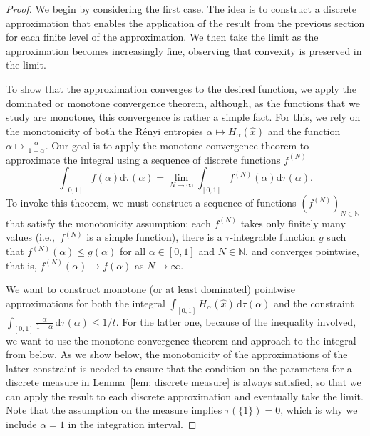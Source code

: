 \documentclass[aps,pra,11pt,onecolumn,nofootinbib,tightenlines]{revtex4-2}
\theoremstyle{definition}
\def \d {\mathrm{d}}
\newcommand{\mb}[1]{\mathbb{#1}}
\begin{document}
\begin{proof}
We begin by considering the first case. The idea is to construct a discrete approximation that enables the application of the result from the previous section for each finite level of the approximation. We then take the limit as the approximation becomes increasingly fine, observing that convexity is preserved in the limit. 

To show that the approximation converges to the desired function, we apply the dominated or monotone convergence theorem, although, as the functions that we study are monotone, this convergence is rather a simple fact. For this, we rely on the monotonicity of both the Rényi entropies $\alpha \mapsto H_\alpha(\hat{x})$ and the function $\alpha \mapsto \frac{\alpha}{1 - \alpha}$. Our goal is to apply the monotone convergence theorem to approximate the integral using a sequence of discrete functions $f^{(N)}$
\begin{equation}
\int_{[0,1]} f(\alpha)\d\tau(\alpha) = \lim_{N \to \infty} \int_{[0,1]} f^{(N)}(\alpha) \d\tau(\alpha).
\end{equation}
To invoke this theorem, we must construct a sequence of functions $(f^{(N)})_{N \in \mathbb{N}}$ that satisfy the monotonicity assumption: each $f^{(N)}$ takes only finitely many values (i.e.,\ $f^{(N)}$ is a simple function), there is a $\tau$-integrable function $g$ such that $f^{(N)}(\alpha) \leq g(\alpha)$ for all $\alpha \in [0,1]$ and $N\in\mb N$, and converges pointwise, that is, $f^{(N)}(\alpha) \to f(\alpha) $ as $ N \to \infty$. 

We want to construct monotone (or at least dominated) pointwise approximations for both the integral $\int_{[0,1]} H_\alpha(\hat{x}) \,\d\tau(\alpha)$ and the constraint $\int_{[0,1]} \frac{\alpha}{1 - \alpha} \,\d\tau(\alpha)\leq 1/t$. For the latter one, because of the inequality involved, we want to use the monotone convergence theorem and approach to the integral from below. As we show below, the monotonicity of the approximations of the latter constraint is needed to ensure that the condition on the parameters for a discrete measure in Lemma~\ref{lem: discrete measure} is always satisfied, so that we can apply the result to each discrete approximation and eventually take the limit. 
Note that the assumption on the measure implies $\tau(\{1\}) = 0$, which is why we include $\alpha = 1$ in the integration interval.


\end{proof}
\end{document}
